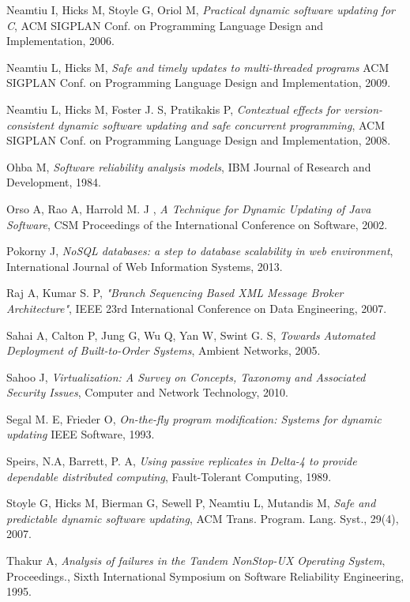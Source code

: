 \documentclass[a4paper,11pt,twoside]{report}
\begin{document}
\begin{thebibliography}{1}
 Neamtiu I, Hicks M, Stoyle G, Oriol M, {\em Practical dynamic software updating for C}, ACM SIGPLAN Conf. on Programming Language Design and Implementation, 2006.

Neamtiu L, Hicks M, {\em Safe and timely updates to multi-threaded programs} ACM SIGPLAN Conf. on Programming Language Design and Implementation, 2009.

 Neamtiu L, Hicks M, Foster J. S, Pratikakis P, {\em Contextual effects for version-consistent dynamic software updating and safe concurrent programming}, ACM SIGPLAN Conf. on Programming Language Design and Implementation, 2008. 

 Ohba M, {\em Software reliability analysis models}, IBM Journal of Research and Development, 1984.

 Orso A, Rao A, Harrold M. J , {\em A Technique for Dynamic Updating of Java Software}, CSM Proceedings of the International Conference on Software, 2002.

 Pokorny J, {\em NoSQL databases: a step to database scalability in web environment}, International Journal of Web Information Systems, 2013. 

 Raj A, Kumar S. P, {\em "Branch Sequencing Based XML Message Broker Architecture"}, IEEE 23rd International Conference on Data Engineering, 2007.  

Sahai A, Calton P, Jung G, Wu Q, Yan W, Swint G. S, {\em Towards Automated Deployment of Built-to-Order Systems}, Ambient Networks, 2005.
  
 Sahoo J, {\em Virtualization: A Survey on Concepts, Taxonomy and Associated Security Issues}, Computer and Network Technology, 2010.

 Segal M. E, Frieder O, \textit{On-the-fly program modification: Systems for dynamic updating} IEEE Software, 1993. 

 Speirs, N.A, Barrett, P. A, {\em Using passive replicates in Delta-4 to provide dependable distributed computing}, Fault-Tolerant Computing, 1989. 

 Stoyle G, Hicks M, Bierman G, Sewell P, Neamtiu L, Mutandis M, {\em Safe and predictable dynamic software updating}, ACM Trans. Program. Lang. Syst., 29(4), 2007.

 Thakur A, {\em Analysis of failures in the Tandem NonStop-UX Operating System}, Proceedings., Sixth International Symposium on Software Reliability Engineering, 1995.
 

\end{thebibliography}
\end{document}
